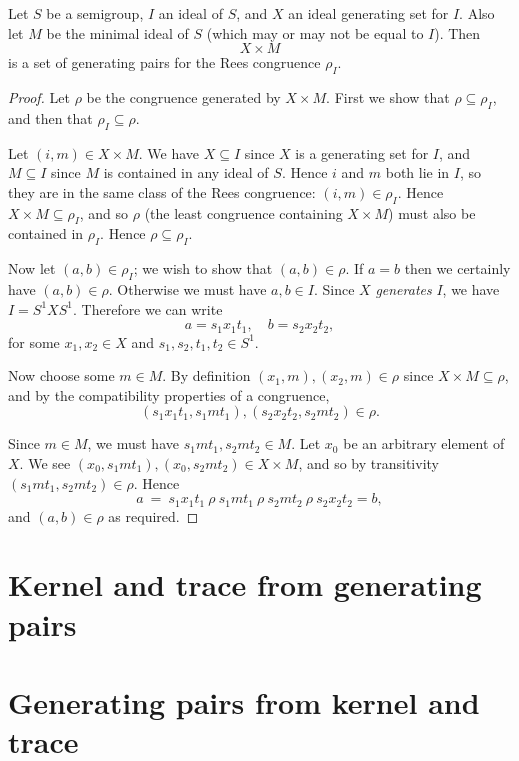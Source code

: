 \begin{theorem}
  Let $S$ be a semigroup, $I$ an ideal of $S$, and $X$ an ideal generating set
  for $I$.  Also let $M$ be the minimal ideal of $S$ (which may or may not be
  equal to $I$).  Then $$X \times M$$ is a set of generating pairs for the Rees
  congruence $\rho_I$.
  \begin{proof}
    Let $\rho$ be the congruence generated by $X \times M$.  First we show that
    $\rho \subseteq \rho_I$, and then that $\rho_I \subseteq \rho$.

    Let $(i,m) \in X \times M$.  We have $X \subseteq I$ since $X$ is a
    generating set for $I$, and $M \subseteq I$ since $M$ is contained in any
    ideal of $S$.  Hence $i$ and $m$ both lie in $I$, so they are in the same
    class of the Rees congruence: $(i,m) \in \rho_I$.  Hence $X \times M
    \subseteq \rho_I$, and so $\rho$ (the least congruence containing $X \times
    M$) must also be contained in $\rho_I$.  Hence $\rho \subseteq \rho_I$.

    Now let $(a,b) \in \rho_I$; we wish to show that $(a,b) \in \rho$.  If $a=b$
    then we certainly have $(a,b) \in \rho$.  Otherwise we must have $a,b \in
    I$.  Since $X$ \textit{generates} $I$, we have $I = S^1XS^1$.  Therefore we
    can write
    $$a = s_1x_1t_1, \quad b = s_2x_2t_2,$$
    for some $x_1,x_2 \in X$ and $s_1,s_2,t_1,t_2 \in S^1$.

    Now choose some $m \in M$.  By definition $(x_1,m), (x_2,m) \in \rho$ since
    $X \times M \subseteq \rho$, and
    by the compatibility properties of a congruence,
    $$(s_1x_1t_1,s_1mt_1), (s_2x_2t_2,s_2mt_2) \in \rho.$$

    Since $m \in M$, we must have $s_1mt_1,s_2mt_2 \in M$.  Let $x_0$ be an
    arbitrary element of $X$.
    We see $(x_0,s_1mt_1), (x_0,s_2mt_2) \in X \times M$, and so by transitivity
    $(s_1mt_1, s_2mt_2) \in \rho$.
    Hence
    $$a ~=~ s_1x_1t_1 ~\rho~ s_1mt_1 ~\rho~ s_2mt_2 ~\rho~ s_2x_2t_2 = b,$$
    and $(a,b) \in \rho$ as required.
  \end{proof}
\end{theorem}

\section{Kernel and trace from generating pairs}
\label{sec:pairs-to-kertr}

\section{Generating pairs from kernel and trace}
\label{sec:kertr-to-pairs}
